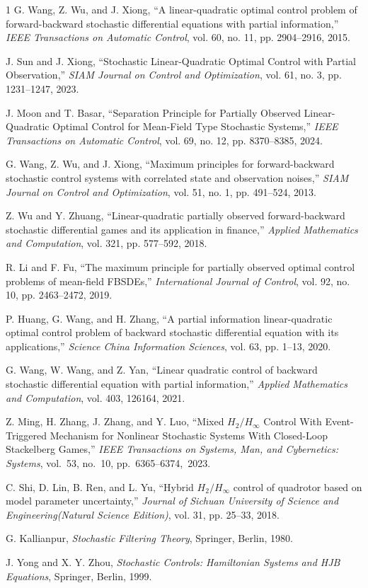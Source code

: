 \documentclass[lettersize,journal]{IEEEtran}
\theoremstyle{plain}
\theoremstyle{definition}
\begin{document}
\begin{thebibliography}{1}
G. Wang, Z. Wu, and J. Xiong, ``A linear-quadratic optimal control problem of forward-backward stochastic differential equations with partial information,'' \textit{IEEE Transactions on Automatic Control}, vol. 60, no. 11, pp. 2904--2916, 2015.

J. Sun and J. Xiong, ``Stochastic Linear-Quadratic Optimal Control with Partial Observation,'' \textit{SIAM Journal on Control and Optimization}, vol. 61, no. 3, pp. 1231--1247, 2023.

J. Moon and T. Basar, ``Separation Principle for Partially Observed Linear-Quadratic Optimal Control for Mean-Field Type Stochastic Systems,'' \textit{IEEE Transactions on Automatic Control}, vol. 69, no. 12, pp. 8370--8385, 2024.

G. Wang, Z. Wu, and J. Xiong, ``Maximum principles for forward-backward stochastic control systems with correlated state and observation noises,'' \textit{SIAM Journal on Control and Optimization}, vol. 51, no. 1, pp. 491--524, 2013.

Z. Wu and Y. Zhuang, ``Linear-quadratic partially observed forward-backward stochastic differential games and its application in finance,'' \textit{Applied Mathematics and Computation}, vol. 321, pp. 577--592, 2018.

R. Li and F. Fu, ``The maximum principle for partially observed optimal control problems of mean-field FBSDEs,'' \textit{International Journal of Control}, vol. 92, no. 10, pp. 2463--2472, 2019.

P. Huang, G. Wang, and H. Zhang, ``A partial information linear-quadratic optimal control problem of backward stochastic differential equation with its applications,'' \textit{Science China Information Sciences}, vol. 63, pp. 1--13, 2020.

G. Wang, W. Wang, and Z. Yan, ``Linear quadratic control of backward stochastic differential equation with partial information,'' \textit{Applied Mathematics and Computation}, vol. 403, 126164, 2021.

Z. Ming, H. Zhang, J. Zhang, and Y. Luo, ``Mixed $H_2/H_\infty$ Control With Event-Triggered Mechanism for Nonlinear Stochastic Systems With Closed-Loop Stackelberg Games,'' \textit{IEEE Transactions on Systems, Man, and Cybernetics: Systems}, vol.~53, no.~10, pp.~6365--6374,~2023.

C. Shi, D. Lin, B. Ren, and L. Yu, ``Hybrid $H_2/H_\infty$ control of quadrotor based on model parameter uncertainty,'' \textit{Journal of Sichuan University of Science and Engineering(Natural Science Edition)}, vol. 31, pp. 25--33, 2018.

G. Kallianpur, \textit{Stochastic Filtering Theory}, Springer, Berlin, 1980.

J. Yong and X. Y. Zhou, \textit{Stochastic Controls: Hamiltonian Systems and HJB Equations}, Springer, Berlin, 1999.




\end{thebibliography}
\end{document}

